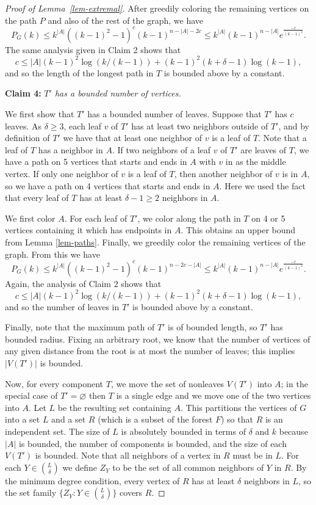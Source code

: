 \documentclass[11pt]{article}
\theoremstyle{plain}
\theoremstyle{definition}
\theoremstyle{remark}
\begin{document}
\begin{proof}[Proof of Lemma~\ref{lem-extremal}]
After greedily coloring the remaining vertices on the path $P$ and also of the rest of the graph, we have
\[
P_{G}(k) \leq k^{|A|}((k-1)^2-1)^c(k-1)^{n-|A|-2c} \leq k^{|A|}(k-1)^{n-|A|}e^{\frac{-c}{(k-1)^2}}.
\]
The same analysis given in Claim 2 shows that 
\[
c \leq |A|(k-1)^2\log(k/(k-1))+(k-1)^2(k+\delta-1)\log(k-1),
\]
and so the length of the longest path in $T$ is bounded above by a constant.

\bigskip

\noindent \textbf{Claim 4:} {\em $T'$ has a bounded number of vertices.}

We first show that $T'$ has a bounded number of leaves. Suppose that $T'$ has $c$ leaves. As $\delta \geq 3$, each leaf $v$ of $T'$ has at least two neighbors outside of $T'$, and by definition of $T'$ we have that at least one neighbor of $v$ is a leaf of $T$.  Note that a leaf of $T$ has a neighbor in $A$.  If two neighbors of a leaf $v$ of $T'$ are leaves of $T$, we have a path on 5 vertices that starts and ends in $A$ with $v$ in as the middle vertex. If only one neighbor of $v$ is a leaf of $T$, then another neighbor of $v$ is in $A$, so we have a path on 4 vertices that starts and ends in $A$. Here we used the fact that every leaf of $T$ has at least $\delta -1 \ge 2$ neighbors in $A$.

We first color $A$. For each leaf of $T'$, we color along the path in $T$ on 4 or 5 vertices containing it which has endpoints in $A$. This obtains an upper bound from Lemma \ref{lem-paths}. Finally, we greedily color the remaining vertices of the graph.  From this we have 
\[
P_{G}(k) \leq k^{|A|} ((k-1)^2-1)^c (k-1)^{n-2c-|A|} \leq k^{|A|} (k-1)^{n-|A|} e^{\frac{-c}{(k-1)^2}}.
\]
Again, the analysis of Claim 2 shows that 
\[
c \leq |A|(k-1)^2\log(k/(k-1))+(k-1)^2(k+\delta-1)\log(k-1), 
\]
and so the number of leaves in $T'$ is bounded above by a constant.

Finally, note that the maximum path of $T'$ is of bounded length, so $T'$ has bounded radius. Fixing an arbitrary root, we know that the number of vertices of any given distance from the root is at most the number of leaves; this implies $|V(T')|$ is bounded.

\bigskip

Now, for every component $T$, we move the set of nonleaves $V(T')$ into $A$; in the special case of $T' = \varnothing$ then $T$ is a single edge and we move one of the two vertices into $A$. Let $L$ be the resulting set containing $A$. This partitions the vertices of $G$ into a set $L$ and a set $R$ (which is a subset of the forest $F$) so that $R$ is an independent set. The size of $L$ is absolutely bounded in terms of $\delta$ and $k$ because $|A|$ is bounded,  the number of components is bounded, and the size of each $V(T')$ is bounded. Note that all neighbors of a vertex in $R$ must be in $L$. For each $Y\in {L \choose \delta}$ we define $Z_Y$ to be the set of all common neighbors of $Y$ in $R$. By the minimum degree condition, every vertex of $R$ has at least $\delta$ neighbors in $L$, so the set family $\{Z_Y: Y \in {L \choose \delta}\}$ covers $R$.


\end{proof}
\end{document}

